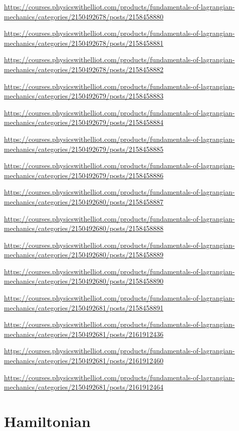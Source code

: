 \documentclass[
]{book}
\theoremstyle{definition}
\theoremstyle{definition}
\theoremstyle{definition}
\theoremstyle{definition}
\theoremstyle{remark}
\begin{document}
\url{https://courses.physicswithelliot.com/products/fundamentals-of-lagrangian-mechanics/categories/2150492678/posts/2158458880}

\url{https://courses.physicswithelliot.com/products/fundamentals-of-lagrangian-mechanics/categories/2150492678/posts/2158458881}

\url{https://courses.physicswithelliot.com/products/fundamentals-of-lagrangian-mechanics/categories/2150492678/posts/2158458882}

\url{https://courses.physicswithelliot.com/products/fundamentals-of-lagrangian-mechanics/categories/2150492679/posts/2158458883}

\url{https://courses.physicswithelliot.com/products/fundamentals-of-lagrangian-mechanics/categories/2150492679/posts/2158458884}

\url{https://courses.physicswithelliot.com/products/fundamentals-of-lagrangian-mechanics/categories/2150492679/posts/2158458885}

\url{https://courses.physicswithelliot.com/products/fundamentals-of-lagrangian-mechanics/categories/2150492679/posts/2158458886}

\url{https://courses.physicswithelliot.com/products/fundamentals-of-lagrangian-mechanics/categories/2150492680/posts/2158458887}

\url{https://courses.physicswithelliot.com/products/fundamentals-of-lagrangian-mechanics/categories/2150492680/posts/2158458888}

\url{https://courses.physicswithelliot.com/products/fundamentals-of-lagrangian-mechanics/categories/2150492680/posts/2158458889}

\url{https://courses.physicswithelliot.com/products/fundamentals-of-lagrangian-mechanics/categories/2150492680/posts/2158458890}

\url{https://courses.physicswithelliot.com/products/fundamentals-of-lagrangian-mechanics/categories/2150492681/posts/2158458891}

\url{https://courses.physicswithelliot.com/products/fundamentals-of-lagrangian-mechanics/categories/2150492681/posts/2161912436}

\url{https://courses.physicswithelliot.com/products/fundamentals-of-lagrangian-mechanics/categories/2150492681/posts/2161912460}

\url{https://courses.physicswithelliot.com/products/fundamentals-of-lagrangian-mechanics/categories/2150492681/posts/2161912464}

\chapter{Hamiltonian}\label{hamiltonian}
\end{document}
